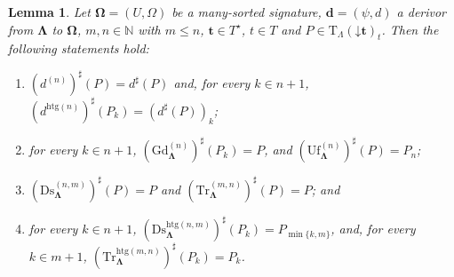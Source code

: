 \documentclass[a4paper, reqno]{amsbook}
\newcommand{\vs}[1]{\mathbin{\downarrow}#1}
\newcommand{\sig}[1]{\mathbf{#1}}             %
\newcommand{\htg}{\mathrm{htg}}                %
\newcommand{\Gd}{\mathrm{Gd}}
\newcommand{\Uf}{\mathrm{Uf}}
\newcommand{\Ds}{\mathrm{Ds}}
\newcommand{\Tr}{\mathrm{Tr}}
\theoremstyle{plain}
\newtheorem{lemma}[theorem]{Lemma}
\theoremstyle{definition}
\begin{document}
\begin{lemma}\label{LChangeSigTerms}
Let $\sig{\Omega}=(U,\Omega)$ be a many-sorted signature, $\mathbf{d}=(\psi,d)$ a derivor from $\sig{\Lambda}$ to $\sig{\Omega}$, $m,n\in\mathbb{N}$ with $m\leq n$, $\mathbf{t}\in T^{\star}$, $t\in T$ and $P\in\mathrm{T}_{\Lambda}(\vs{\mathbf{t}})_{t}$.
Then the following statements hold:
\begin{enumerate}
\item $(d^{(n)})^{\sharp}(P)=d^{\sharp}(P)$ and, for every $k\in n+1$, $(d^{\htg(n)})^{\sharp}(P_{k})=(d^{\sharp}(P))_{k}$;
\item for every $k\in n+1$, $(\Gd^{(n)}_{\sig{\Lambda}})^{\sharp}(P_{k})=P$, and $(\Uf^{(n)}_{\sig{\Lambda}})^{\sharp}(P)=P_{n}$;
\item $(\Ds^{(n,m)}_{\sig{\Lambda}})^{\sharp}(P)=P$ and $(\Tr^{(m,n)}_{\sig{\Lambda}})^{\sharp}(P)=P$; and
\item for every $k\in n+1$, $(\Ds^{\htg(n,m)}_{\sig{\Lambda}})^{\sharp}(P_{k})=P_{\min\{k,m\}}$, and, for every $k\in m+1$, $(\Tr^{\htg(m,n)}_{\sig{\Lambda}})^{\sharp}(P_{k})=P_{k}$.
\end{enumerate}
\end{lemma}
\end{document}
